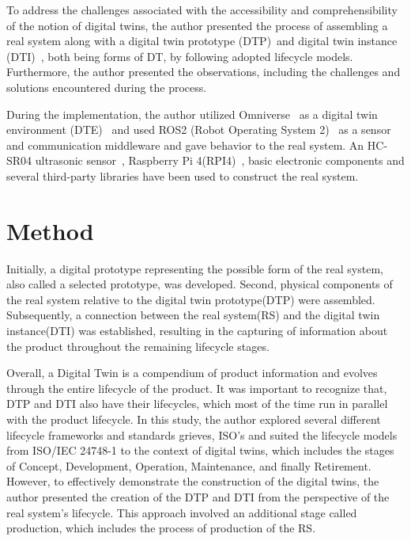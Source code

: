 \documentclass[conference]{IEEEtran}
\begin{document}
    To address the challenges associated with the accessibility and comprehensibility of the notion of digital twins, the author presented the
    process of assembling a real system along with a digital twin prototype (DTP)~\cite{Originsofdigitaltwinconcept}and digital twin instance (DTI)~\cite{Originsofdigitaltwinconcept}, both being forms of DT, 
    by following adopted lifecycle models. Furthermore, the author presented the observations, including the challenges and solutions encountered during the process.

    During the implementation, the author utilized Omniverse~\cite{Omniverse} as a digital twin environment (DTE)~\cite{Originsofdigitaltwinconcept} and used ROS2 (Robot Operating System 2)~\cite{ROS2}
    as a sensor and communication middleware and gave behavior to the real system. An HC-SR04 ultrasonic sensor~\cite{HCSR04}, Raspberry Pi 4(RPI4)~\cite{RPI4}, 
    basic electronic components and several third-party libraries have been used to construct the real system. 

    \section{Method}\label{section:Method}
    Initially, a digital prototype representing the possible form of the real system, 
    also called a selected prototype, was developed. Second, physical components of the real system 
    relative to the digital twin prototype(DTP) were assembled. Subsequently, a connection between the real system(RS) 
    and the digital twin instance(DTI) was established, 
    resulting in the capturing of information about the product throughout the remaining lifecycle stages.

    Overall, a Digital Twin is a compendium of product information and evolves through the entire lifecycle of the product.
    It was important to recognize that, DTP and DTI also have their lifecycles,
    which most of the time run in parallel with the product lifecycle. 
    In this study, the author explored several different lifecycle frameworks and standards {grieves, ISO's} and 
    suited the lifecycle models from ISO/IEC 24748-1 to the context of digital twins, which includes the stages of  
    Concept, Development, Operation, Maintenance, and finally Retirement.  However, to effectively demonstrate the construction of the digital twins, 
    the author presented the creation of the DTP and DTI from the perspective of the real system's lifecycle. This approach involved an additional stage called production, 
    which includes the process of production of the RS.
    
\end{document}
